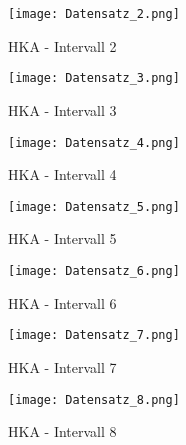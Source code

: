         \begin{figure}[H]
            \centering
            \texttt{[image: Datensatz\_2.png]}
            \caption{HKA - Intervall 2}
            \label{fig: HKA_intervall_2}
        \end{figure}

        \begin{figure}[H]
            \centering
            \texttt{[image: Datensatz\_3.png]}
            \caption{HKA - Intervall 3}
            \label{fig: HKA_intervall_3}
        \end{figure}

        \begin{figure}[H]
            \centering
            \texttt{[image: Datensatz\_4.png]}
            \caption{HKA - Intervall 4}
            \label{fig: HKA_intervall_4}
        \end{figure}

        \begin{figure}[H]
            \centering
            \texttt{[image: Datensatz\_5.png]}
            \caption{HKA - Intervall 5}
            \label{fig: HKA_intervall_5}
        \end{figure}

        \begin{figure}[H]
            \centering
            \texttt{[image: Datensatz\_6.png]}
            \caption{HKA - Intervall 6}
            \label{fig: HKA_intervall_6}
        \end{figure}

        \begin{figure}[H]
            \centering
            \texttt{[image: Datensatz\_7.png]}
            \caption{HKA - Intervall 7}
            \label{fig: HKA_intervall_7}
        \end{figure}

        \begin{figure}[H]
            \centering
            \texttt{[image: Datensatz\_8.png]}
            \caption{HKA - Intervall 8}
            \label{fig: HKA_intervall_8}
        \end{figure}

